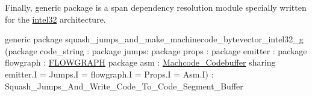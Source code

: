 Finally, generic package  is a span dependency resolution
module specially written for the \href{intel32.html}{intel32} architecture.
\begin{SML}
generic package squash_jumps_and_make_machinecode_bytevector_intel32_g
  (package code_string : 
   package jumps: 
   package props : 
   package emitter : 
   package flowgraph : \href{cluster.html}{FLOWGRAPH}
   package asm : \href{asm.html}{Machcode_Codebuffer}
      sharing emitter.I = Jumps.I = flowgraph.I = Props.I = Asm.I) : Squash_Jumps_And_Write_Code_To_Code_Segment_Buffer 
\end{SML}


